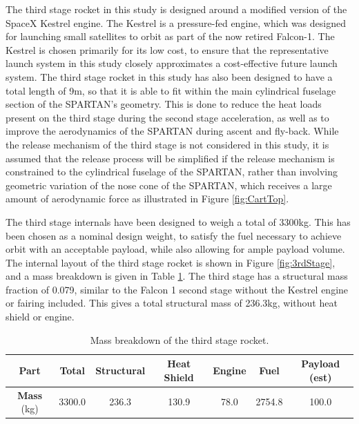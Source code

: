   The third stage rocket in this study is designed around a modified version of the SpaceX Kestrel engine. The Kestrel is a pressure-fed engine, which was designed for launching small satellites to orbit as part of the now retired Falcon-1. The Kestrel is chosen primarily for its low cost, to ensure that the representative launch system in this study closely approximates a cost-effective future launch system.  
  The third stage rocket in this study has also been designed to have a total length of 9m, so that it is able to fit within the main cylindrical fuselage section of the SPARTAN's geometry.  This is done to reduce the heat loads present on the third stage during the second stage acceleration, as well as to improve the aerodynamics of the SPARTAN during ascent and fly-back. While the release mechanism of the third stage is not considered in this study, it is assumed that the release process will be simplified if the release mechanism is constrained to the cylindrical fuselage of the SPARTAN, rather than involving geometric variation of the nose cone of the SPARTAN, which receives a large amount of aerodynamic force as illustrated in Figure \ref{fig:CartTop}.
  
 The third stage internals have been designed to weigh a total of 3300kg. This has been chosen as a nominal design weight, to satisfy the fuel necessary to achieve orbit with an acceptable payload, while also allowing for ample payload volume. The internal layout of the third stage rocket is shown in Figure \ref{fig:3rdStage}, and a mass breakdown is given in Table \ref{tab:MassBreakdown3}. The third stage has a structural mass fraction of 0.079, similar to the Falcon 1 second stage without the Kestrel engine or fairing included\cite{Vehicle2008}. This gives a total structural mass of 236.3kg, without heat shield or engine. 
 

 
	\begin{table}[h]
		\centering
		\begin{tabular}{|c|c|c|c|c|c|c|}
			\hline  \textbf{Part} & Total & Structural & Heat Shield & Engine & Fuel & Payload (est) \\ 
			\hline \textbf{Mass} (kg) & 3300.0  & 236.3  & 130.9  & 78.0  & 2754.8 & 100.0\\ 
			\hline 
		\end{tabular} 
		\caption{Mass breakdown of the third stage rocket.}
		\label{tab:MassBreakdown3}
	\end{table}
 
 
 

